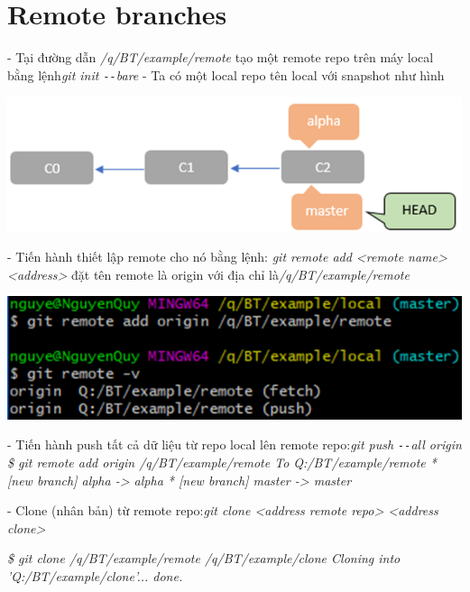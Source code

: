 \documentclass[12pt,a4paper]{report}
\begin{document}
	\label{fig:screenshot064}

	\vskip 0.4cm	\vskip 0.4cm
			\newpage			
\section{Remote branches}
\hspace{0.6cm}- Tại đường dẫn {\it /q/BT/example/remote} tạo một remote repo trên máy local bằng lệnh{\it git init \texttt{-{}-}bare} \vskip 0.4cm
- Ta có một local repo tên local với snapshot như hình\vskip 0.4cm

	\includegraphics[width=0.8\linewidth]{screenshot065}
	
	\label{fig:screenshot065}\vskip 0.4cm\vskip 0.4cm

- Tiến hành thiết lập remote cho nó bằng lệnh: {\it git remote add <remote  name> <address>} đặt tên remote là origin với địa chỉ là{\it /q/BT/example/remote}\vskip 0.4cm

	\includegraphics[width=0.8\linewidth]{screenshot066}

	\label{fig:screenshot066}
\vskip 0.4cm\vskip 0.4cm
- Tiến hành push tất cả dữ liệu từ repo local lên remote repo:{\it git push \texttt{-{}-}all origin}
\vskip 0.4cm
{\it  \hspace{1cm}\$ git remote add origin /q/BT/example/remote\vskip 0.1cm
 \hspace{1cm}To Q:/BT/example/remote\vskip 0.1cm
 \hspace{1cm}* [new branch]      alpha -> alpha\vskip 0.1cm
 \hspace{1cm}* [new branch]      master -> master}\vskip 0.4cm

 - Clone (nhân bản) từ remote repo:{\it git clone <address remote repo> <address clone>}\vskip 0.4cm
 
 {\it \hspace{1cm} \$ git clone /q/BT/example/remote /q/BT/example/clone\vskip 0.1cm
 \hspace{1cm} Cloning into 'Q:/BT/example/clone'...\vskip 0.1cm
 \hspace{1cm} done.}\vskip 0.4cm
 
\end{document}
